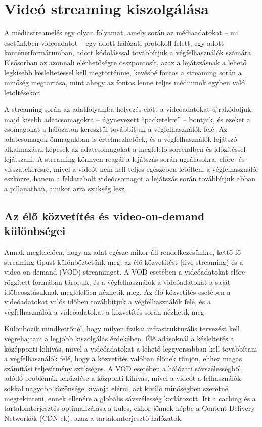 \section{Videó streaming kiszolgálása}

A médiastreamelés egy olyan folyamat, amely során az médiaadatokat -- mi esetünkben videóadatot -- egy adott hálózati protokoll felett, egy adott konténerformátumban, adott kódolásssal továbbítjuk a végfelhasználók számára. Elsősorban az azonnali elérhetőségre összpontosít, azaz a lejátszásnak a lehető legkisebb késleltetéssel kell megtörténnie, kevésbé fontos a streaming során a minőség megtartása, mint ahogy az fontos lenne teljes médiumok egyben való letöltésekor.

A streaming során az adatfolyamba helyezés előtt a videóadatokat újrakódoljuk, majd kisebb adatcsomagokra -- úgynevezett ``packetekre'' -- bontjuk, és ezeket a csomagokat a hálózaton keresztül továbbítjuk a végfelhasználók felé. Az adatcsomagok önmagukban is értelmezhetőek, és a végfelhasználók lejátszó alkalmazásai képesek az adatcsomagokat a megfelelő sorrendben és időzítéssel lejátszani. A streaming könnyen reagál a lejátszás során ugrálásokra, előre- és visszatekerésre, mivel a videót nem kell teljes egészében letölteni a végfelhasználói eszközre, hanem a feldarabolt videócsomagot a lejátszás során továbbítjuk abban a pillanatban, amikor arra szükség lesz.

\subsection{Az élő közvetítés és video-on-demand különbségei}

Annak megfelelően, hogy az adat egésze mikor áll rendelkezésünkre, kettő fő streaming típust különböztetünk meg: az élő közvetítést (live streaming) és a video-on-demand (VOD) streaminget. A VOD esetében a videóadatokat előre rögzített formában tároljuk, és a végfelhasználók a videóadatokat a saját időbeosztásuknak megfelelően nézhetik meg. Az élő közvetítés esetében a videóadatokat valós időben továbbítjuk a végfelhasználók felé, és a végfelhasználók a videóadatokat a közvetítés során nézhetik meg.

Különbözik mindkettőnél, hogy milyen fizikai infrastrukturális tervezést kell végrehajtani a legjobb kiszolgálás érdekében. Élő adásoknál a késleltetés a középponti kihívás, mivel a videóadatokat a lehető leggyorsabban kell továbbítani a végfelhasználók felé, hogy a közvetítés valóban élőnek tűnjön, ehhez magas számítási teljesítmény szükséges. A VOD esetében a hálózati sávszélességből adódó problémák leküzdése a központi kihívás, mivel a videót a felhasználók sokkal nagyobb közönsége kívánja elérni, azt kiváló minőségben szeretné megtekinteni, ennek ellenére a globális sávszélesség korlátozott. Itt a caching és a tartalomterjesztés optimalizálása a kulcs, ekkor jönnek képbe a Content Delivery Networkök (CDN-ek), azaz a tartalomterjesztő hálózatok.

